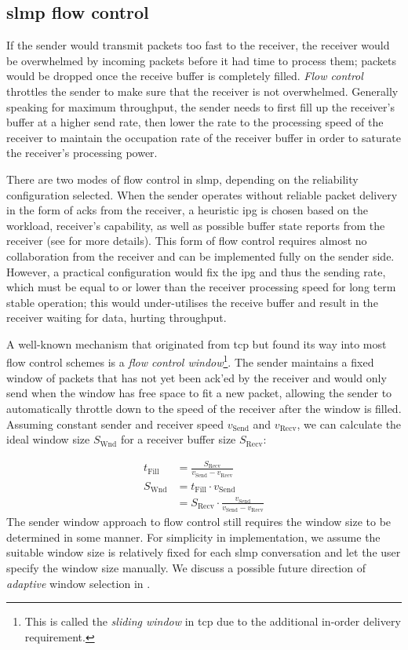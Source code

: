 \subsection{\acs{slmp} flow control} \label{sec:slmp-fc}

If the sender would transmit packets too fast to the receiver, the receiver would be overwhelmed by incoming packets before it had time to process them; packets would be dropped once the receive buffer is completely filled.  \emph{Flow control} throttles the sender to make sure that the receiver is not overwhelmed.  Generally speaking for maximum throughput, the sender needs to first fill up the receiver's buffer at a higher send rate, then lower the rate to the processing speed of the receiver to maintain the occupation rate of the receiver buffer in order to saturate the receiver's processing power.

There are two modes of flow control in \ac{slmp}, depending on the reliability configuration selected.  When the sender operates without reliable packet delivery in the form of \ac{ack}s from the receiver, a heuristic \ac{ipg} is chosen based on the workload, receiver's capability, as well as possible buffer state reports from the receiver (see  for more details).  This form of flow control requires almost no collaboration from the receiver and can be implemented fully on the sender side.  However, a practical configuration would fix the \ac{ipg} and thus the sending rate, which must be equal to or lower than the receiver processing speed for long term stable operation; this would under-utilises the receive buffer and result in the receiver waiting for data, hurting throughput.

A well-known mechanism that originated from \ac{tcp} but found its way into most flow control schemes is a \emph{flow control window}\footnote{This is called the \emph{sliding window} in \ac{tcp} due to the additional in-order delivery requirement.}.  The sender maintains a fixed window of packets that has not yet been \ac{ack}'ed by the receiver and would only send when the window has free space to fit a new packet, allowing the sender to automatically throttle down to the speed of the receiver after the window is filled.  Assuming constant sender and receiver speed $v_\text{Send}$ and $v_\text{Recv}$, we can calculate the ideal window size $S_\text{Wnd}$ for a receiver buffer size $S_\text{Recv}$:

\begin{align}
t_\text{Fill} &= \frac{S_\text{Recv}}{v_\text{Send} - v_\text{Recv}} \\
S_\text{Wnd} &= t_\text{Fill} \cdot v_\text{Send} \\
&= S_\text{Recv} \cdot \frac{v_\text{Send}}{v_\text{Send} - v_\text{Recv}}
\end{align}
The sender window approach to flow control still requires the window size to be determined in some manner.  For simplicity in implementation, we assume the suitable window size is relatively fixed for each \ac{slmp} conversation and let the user specify the window size manually.  We discuss a possible future direction of \emph{adaptive} window selection in .

